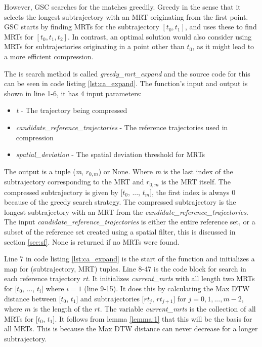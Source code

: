 However, GSC searches for the matches greedily. Greedy in the sense that it selects the longest subtrajectory with an MRT originating from the first point. GSC starts by finding MRTs for the subtrajectory $[t_0, t_1]$, and uses these to find MRTs for $[t_0, t_1, t_2]$. In contrast, an optimal solution would also consider using MRTs for subtrajectories originating in a point other than $t_0$, as it might lead to a more efficient compression.

The is search method is called \textit{greedy\_mrt\_expand} and the source code for this can be seen in code listing \ref{lst:ca_expand}. The function's input and output is shown in line 1-6, it has 4 input parameters:



\begin{itemize}
    \item{\textit{t} - The trajectory being compressed}
    \item{\textit{candidate\_reference\_trajectories} - The reference trajectories used in compression}
    \item{\textit{spatial\_deviation} - The spatial deviation threshold for MRTs}
\end{itemize}

The output is a tuple (\textit{m}, $r_{0,m}$) or None. Where \textit{m} is the last index of the subtrajectory corresponding to the MRT and $r_{0,m}$ is the MRT itself. The compressed subtrajectory is given by [$t_0$, ..., $t_m$], the first index is always 0 because of the greedy search strategy. The compressed subtrajectory is the longest subtrajectory with an MRT from the \textit{candidate\_reference\_trajectories}. The input \textit{candidate\_reference\_trajectories} is either the entire reference set, or a subset of the reference set created using a spatial filter, this is discussed in section \ref{sec:sf}. None is returned if no MRTs were found.

Line 7 in code listing \ref{lst:ca_expand} is the start of the function and initializes a map for (subtrajectory, MRT) tuples. Line 8-47 is the code block for search in each reference trajectory \textit{rt}. It initializes \textit{current\_mrts} with all length two MRTs for [$t_0$, ..., $t_i$] where $i = 1$ (line 9-15). It does this by calculating the Max DTW distance between [$t_0$, $t_1$] and subtrajectories [$rt_j$, $rt_{j+1}$] for $j = 0, 1, ..., m-2$, where $m$ is the length of the $rt$. The variable \textit{current\_mrts} is the collection of all MRTs for [$t_0$, $t_1$]. It follows from lemma \ref{lemma:1} that this will be the basis for all MRTs. This is because the Max DTW distance can never decrease for a longer subtrajectory.

